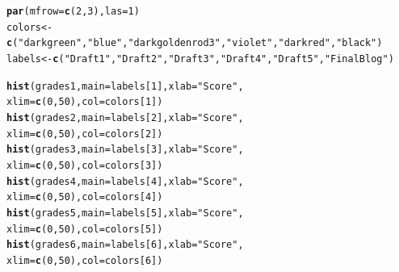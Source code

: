 \documentclass{article}\usepackage[]{graphicx}\usepackage[]{color}
\makeatletter
\newcommand{\hlnum}[1]{\textcolor[rgb]{0.686,0.059,0.569}{#1}}%
\newcommand{\hlstr}[1]{\textcolor[rgb]{0.192,0.494,0.8}{#1}}%
\newcommand{\hlstd}[1]{\textcolor[rgb]{0.345,0.345,0.345}{#1}}%
\newcommand{\hlkwb}[1]{\textcolor[rgb]{0.69,0.353,0.396}{#1}}%
\newcommand{\hlkwc}[1]{\textcolor[rgb]{0.333,0.667,0.333}{#1}}%
\newcommand{\hlkwd}[1]{\textcolor[rgb]{0.737,0.353,0.396}{\textbf{#1}}}%
\newenvironment{kframe}{%
 \def\at@end@of@kframe{}%
 \ifinner\ifhmode%
  \def\at@end@of@kframe{\end{minipage}}%
  \begin{minipage}{\columnwidth}%
 \fi\fi%
 \def\FrameCommand##1{\hskip\@totalleftmargin \hskip-\fboxsep
 \colorbox{shadecolor}{##1}\hskip-\fboxsep
     \hskip-\linewidth \hskip-\@totalleftmargin \hskip\columnwidth}%
 \MakeFramed {\advance\hsize-\width
   \@totalleftmargin\z@ \linewidth\hsize
   \@setminipage}}%
 {\par\unskip\endMakeFramed%
 \at@end@of@kframe}
\newenvironment{knitrout}{}{} %
\makeatother
\begin{document}
\bigskip
\begin{knitrout}
\color{fgcolor}\begin{kframe}
\begin{alltt}
\hlkwd{par}\hlstd{(}\hlkwc{mfrow}\hlstd{=}\hlkwd{c}\hlstd{(}\hlnum{2}\hlstd{,}\hlnum{3}\hlstd{),} \hlkwc{las}\hlstd{=}\hlnum{1}\hlstd{)}
\hlstd{colors} \hlkwb{<-} \hlkwd{c}\hlstd{(}\hlstr{"darkgreen"}\hlstd{,} \hlstr{"blue"}\hlstd{,} \hlstr{"darkgoldenrod3"}\hlstd{,} \hlstr{"violet"}\hlstd{,} \hlstr{"darkred"}\hlstd{,} \hlstr{"black"}\hlstd{)}
\hlstd{labels} \hlkwb{<-} \hlkwd{c}\hlstd{(}\hlstr{"Draft 1"}\hlstd{,} \hlstr{"Draft 2"}\hlstd{,} \hlstr{"Draft 3"}\hlstd{,} \hlstr{"Draft 4"}\hlstd{,} \hlstr{"Draft 5"}\hlstd{,} \hlstr{"Final Blog"}\hlstd{)}


\hlkwd{hist}\hlstd{(grades1,} \hlkwc{main}\hlstd{=labels[}\hlnum{1}\hlstd{],} \hlkwc{xlab}\hlstd{=}\hlstr{"Score"}\hlstd{,}
     \hlkwc{xlim}\hlstd{=}\hlkwd{c}\hlstd{(}\hlnum{0}\hlstd{,}\hlnum{50}\hlstd{),} \hlkwc{col}\hlstd{=colors[}\hlnum{1}\hlstd{])}
\hlkwd{hist}\hlstd{(grades2,} \hlkwc{main}\hlstd{=labels[}\hlnum{2}\hlstd{],} \hlkwc{xlab}\hlstd{=}\hlstr{"Score"}\hlstd{,}
     \hlkwc{xlim}\hlstd{=}\hlkwd{c}\hlstd{(}\hlnum{0}\hlstd{,}\hlnum{50}\hlstd{),} \hlkwc{col}\hlstd{=colors[}\hlnum{2}\hlstd{])}
\hlkwd{hist}\hlstd{(grades3,} \hlkwc{main}\hlstd{=labels[}\hlnum{3}\hlstd{],} \hlkwc{xlab}\hlstd{=}\hlstr{"Score"}\hlstd{,}
     \hlkwc{xlim}\hlstd{=}\hlkwd{c}\hlstd{(}\hlnum{0}\hlstd{,}\hlnum{50}\hlstd{),} \hlkwc{col}\hlstd{=colors[}\hlnum{3}\hlstd{])}
\hlkwd{hist}\hlstd{(grades4,} \hlkwc{main}\hlstd{=labels[}\hlnum{4}\hlstd{],} \hlkwc{xlab}\hlstd{=}\hlstr{"Score"}\hlstd{,}
     \hlkwc{xlim}\hlstd{=}\hlkwd{c}\hlstd{(}\hlnum{0}\hlstd{,}\hlnum{50}\hlstd{),} \hlkwc{col}\hlstd{=colors[}\hlnum{4}\hlstd{])}
\hlkwd{hist}\hlstd{(grades5,} \hlkwc{main}\hlstd{=labels[}\hlnum{5}\hlstd{],} \hlkwc{xlab}\hlstd{=}\hlstr{"Score"}\hlstd{,}
     \hlkwc{xlim}\hlstd{=}\hlkwd{c}\hlstd{(}\hlnum{0}\hlstd{,}\hlnum{50}\hlstd{),} \hlkwc{col}\hlstd{=colors[}\hlnum{5}\hlstd{])}
\hlkwd{hist}\hlstd{(grades6,} \hlkwc{main}\hlstd{=labels[}\hlnum{6}\hlstd{],} \hlkwc{xlab}\hlstd{=}\hlstr{"Score"}\hlstd{,}
     \hlkwc{xlim}\hlstd{=}\hlkwd{c}\hlstd{(}\hlnum{0}\hlstd{,}\hlnum{50}\hlstd{),} \hlkwc{col}\hlstd{=colors[}\hlnum{6}\hlstd{])}
\end{alltt}
\end{kframe}\begin{figure}

\end{figure}
\end{knitrout}
\end{document}
